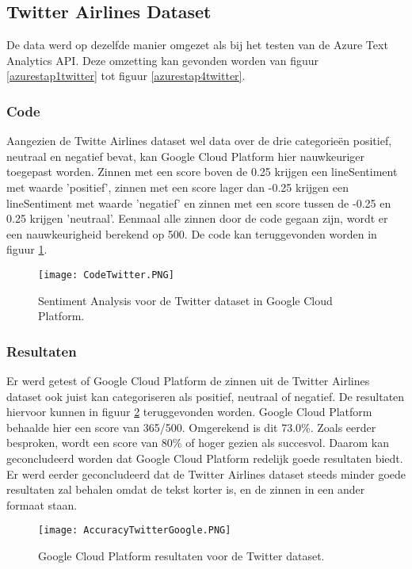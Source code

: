 \subsection{Twitter Airlines Dataset}
\label{twittergoogleplatform}

De data werd op dezelfde manier omgezet als bij het testen van de Azure Text Analytics API. Deze omzetting kan gevonden worden van figuur \ref{azurestap1twitter} tot figuur \ref{azurestap4twitter}.

\subsubsection{Code}
\label{twittercodegoogleplatform}
Aangezien de Twitte Airlines dataset wel data over de drie categorieën positief, neutraal en negatief bevat, kan Google Cloud Platform hier nauwkeuriger toegepast worden. Zinnen met een score boven de 0.25 krijgen een lineSentiment met waarde 'positief', zinnen met een score lager dan -0.25 krijgen een lineSentiment met waarde 'negatief' en zinnen met een score tussen de -0.25 en 0.25 krijgen 'neutraal'. Eenmaal alle zinnen door de code gegaan zijn, wordt er een nauwkeurigheid berekend op 500. De code kan teruggevonden worden in figuur \ref{codetwitter}.

\begin{figure}[!htbp]
    \texttt{[image: CodeTwitter.PNG]}
    \caption{\label{codetwitter}Sentiment Analysis voor de Twitter dataset in Google Cloud Platform.}
\end{figure}
\FloatBarrier 

\subsubsection{Resultaten}
\label{twitterresultatengoogleplatform}
Er werd getest of Google Cloud Platform de zinnen uit de Twitter Airlines dataset ook juist kan categoriseren als positief, neutraal of negatief. De resultaten hiervoor kunnen in figuur \ref{accuracytwitter} teruggevonden worden. Google Cloud Platform behaalde hier een score van 365/500. Omgerekend is dit 73.0\%. Zoals eerder besproken, wordt een score van 80\% of hoger gezien als succesvol. Daarom kan geconcludeerd worden dat Google Cloud Platform redelijk goede resultaten biedt. Er werd eerder geconcludeerd dat de Twitter Airlines dataset steeds minder goede resultaten zal behalen omdat de tekst korter is, en de zinnen in een ander formaat staan. 

\begin{figure}[!htbp]
    \texttt{[image: AccuracyTwitterGoogle.PNG]}
    \caption{\label{accuracytwitter}Google Cloud Platform resultaten voor de Twitter dataset.}
\end{figure}
\FloatBarrier 

